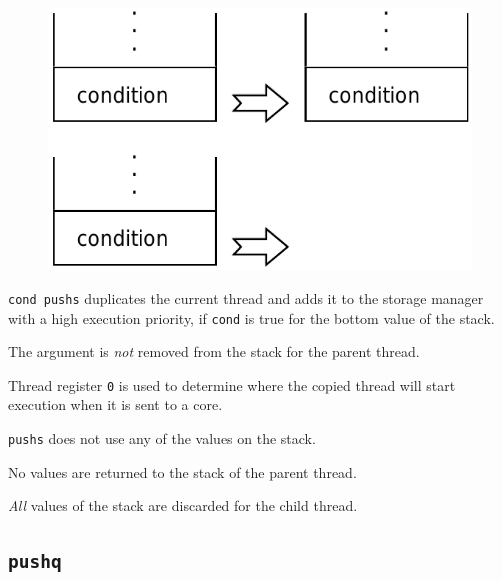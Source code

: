 		\begin{figure}
			\begin{flushright}
				\includegraphics[width=\linewidth]{figure/pdf/i_push} 
			\end{flushright}
		\end{figure}
	
			\texttt{cond pushs} duplicates the current thread and adds it to
			the storage manager with a high execution priority, if
			\texttt{cond} is true for the bottom value of the stack.

			The argument is \emph{not} removed from the stack for the parent 
			thread.

			Thread register \texttt{0} is used to determine where the copied
			thread will start execution when it is sent to a core.

			\texttt{pushs} does not use any of the values on the stack.
			
			No values are returned to the stack of the parent thread.

			\emph{All} values of the stack are discarded for the child thread.
	
	\qquad

	\subsection*{\texttt{pushq}}
	
